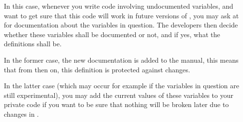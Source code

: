 In this case, whenever you write {\GAP} code involving undocumented
variables,
and want to get sure that this code will work in future versions of {\GAP},
you may ask at  for documentation
about the variables in question.
The {\GAP} developers then decide whether these variables shall be
documented or not, and if yes, what the definitions shall be.

In the former case, the new documentation is added to the {\GAP} manual,
this means that from then on, this definition is protected against
changes.

In the latter case (which may occur for example if the variables
in question are still experimental), you may add the current
values of these variables to your private code if you want to
be sure that nothing will be broken later due to changes in {\GAP}.



